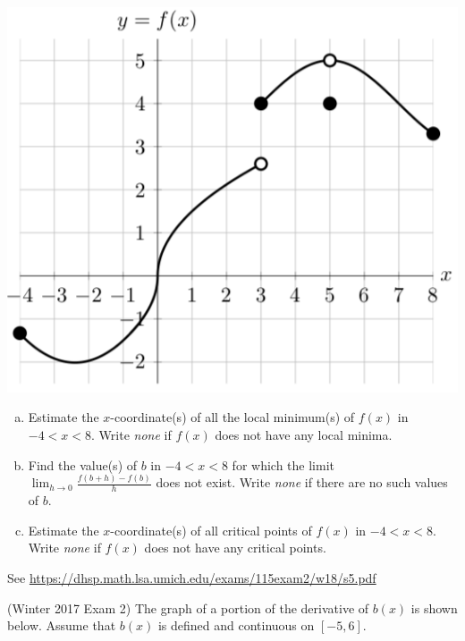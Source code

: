 \documentclass[11pt]{exam}
\begin{document}
\begin{questions}
\begin{itemize}
\end{itemize}
\vspace{-0.5em}
\begin{center}
  \includegraphics[scale=0.4]{Exam2W2018Problem5}
\end{center}
\begin{enumerate}[(a)]
	\item Estimate the $x$-coordinate(s) of all the local minimum(s) of $f(x)$ in $-4<x<8$. Write \emph{none} if $f(x)$ does not have any local minima.
	\item Find the value(s) of $b$ in $-4<x<8$ for which the limit $\displaystyle\lim_{h \rightarrow 0} \frac{f(b+h)-f(b)}{h}$
does not exist. Write \emph{none} if there are no such values of $b$.
 	\item Estimate the $x$-coordinate(s) of all critical points of $f(x)$ in $-4 < x < 8$. Write \emph{none} if $f(x)$ does not have any critical points.
\end{enumerate}
\begin{solution}
  See \href{https://dhsp.math.lsa.umich.edu/exams/115exam2/w18/s5.pdf}{https://dhsp.math.lsa.umich.edu/exams/115exam2/w18/s5.pdf}
\end{solution}
      \question (Winter 2017 Exam 2) %
        The graph of a portion of the derivative of $b(x)$ is shown below. Assume that $b(x)$ is defined and continuous on $[-5, 6]$.
        \begin{center}

\end{center}
\end{questions}
\end{document}
